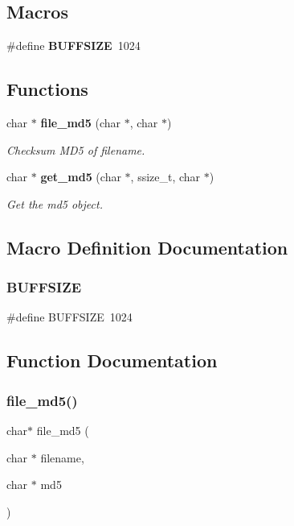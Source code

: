 \subsection*{Macros}
\begin{DoxyCompactItemize}
\item 
\#define \textbf{ B\+U\+F\+F\+S\+I\+ZE}~1024
\end{DoxyCompactItemize}
\subsection*{Functions}
\begin{DoxyCompactItemize}
\item 
char $\ast$ \textbf{ file\+\_\+md5} (char $\ast$, char $\ast$)
\begin{DoxyCompactList}\small\item\em Checksum M\+D5 of filename. \end{DoxyCompactList}\item 
char $\ast$ \textbf{ get\+\_\+md5} (char $\ast$, ssize\+\_\+t, char $\ast$)
\begin{DoxyCompactList}\small\item\em Get the md5 object. \end{DoxyCompactList}\end{DoxyCompactItemize}


\subsection{Macro Definition Documentation}
\mbox{\label{md5_8h_a39912bfe2a55f30e269196f9141d845d}} 
\subsubsection{B\+U\+F\+F\+S\+I\+ZE}
{\footnotesize\ttfamily \#define B\+U\+F\+F\+S\+I\+ZE~1024}



\subsection{Function Documentation}
\mbox{\label{md5_8h_abb8d33df0713fc64b9e32341af87a810}} 
\subsubsection{file\+\_\+md5()}
{\footnotesize\ttfamily char$\ast$ file\+\_\+md5 (\begin{DoxyParamCaption}\item[{char $\ast$}]{filename,  }\item[{char $\ast$}]{md5 }\end{DoxyParamCaption})}



